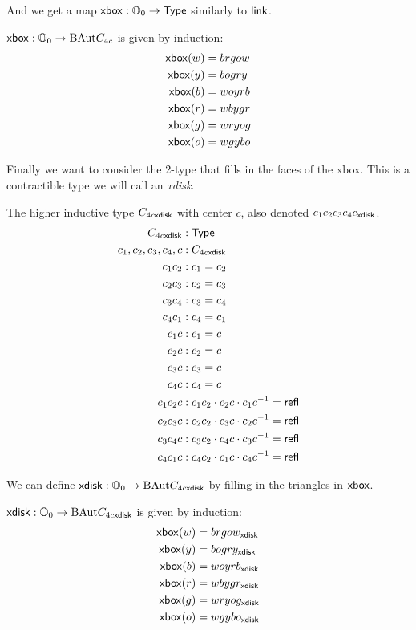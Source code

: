 And we get a map \( \mathsf{xbox}:\mathbb{O}_0\to\mathsf{Type} \) similarly to \( \mathsf{link} \).
\begin{mydef}
\( \mathsf{xbox}:\mathbb{O}_0\to\mathrm{BAut} C_{4c} \) is given by induction:
\begin{align*}
\mathsf{xbox}(w) &= brgow \\
\mathsf{xbox}(y) &= bogry \\
\mathsf{xbox}(b) &= woyrb \\
\mathsf{xbox}(r) &= wbygr \\
\mathsf{xbox}(g) &= wryog \\
\mathsf{xbox}(o) &= wgybo
\end{align*}
\end{mydef}

Finally we want to consider the 2-type that fills in the faces of the xbox. This is a contractible type we will call an \emph{xdisk}. 

\begin{mydef}
The higher inductive type \( C_{4c\mathsf{xdisk}} \) with center \( c \), also denoted \( c_1c_2c_3c_4c_{\mathsf{xdisk}} \).
\begin{align*}
C_{4c\mathsf{xdisk}} &: \mathsf{Type} \\
c_1, c_2, c_3, c_4, c &: C_{4c\mathsf{xdisk}} \\
c_1c_2 &: c_1 = c_2 \\
c_2c_3 &: c_2 = c_3 \\
c_3c_4 &: c_3 = c_4 \\
c_4c_1 &: c_4 = c_1 \\
c_1c &: c_1 = c \\
c_2c &: c_2 = c \\
c_3c &: c_3 = c \\
c_4c &: c_4 = c \\
c_1c_2c &: c_1c_2\cdot c_2c\cdot c_1c^{-1} = \mathsf{refl} \\
c_2c_3c &: c_2c_2\cdot c_3c\cdot c_2c^{-1} = \mathsf{refl} \\
c_3c_4c &: c_3c_2\cdot c_4c\cdot c_3c^{-1} = \mathsf{refl} \\
c_4c_1c &: c_4c_2\cdot c_1c\cdot c_4c^{-1} = \mathsf{refl}
\end{align*}
\end{mydef}

We can define \( \mathsf{xdisk}:\mathbb{O}_0\to\mathrm{BAut} C_{4c\mathsf{xdisk}} \) by filling in the triangles in \( \mathsf{xbox} \).

\begin{mydef}
\( \mathsf{xdisk}:\mathbb{O}_0\to\mathrm{BAut} C_{4c\mathsf{xdisk}} \) is given by induction:
\begin{align*}
\mathsf{xbox}(w) &= brgow_{\mathsf{xdisk}} \\
\mathsf{xbox}(y) &= bogry_{\mathsf{xdisk}} \\
\mathsf{xbox}(b) &= woyrb_{\mathsf{xdisk}} \\
\mathsf{xbox}(r) &= wbygr_{\mathsf{xdisk}} \\
\mathsf{xbox}(g) &= wryog_{\mathsf{xdisk}} \\
\mathsf{xbox}(o) &= wgybo_{\mathsf{xdisk}}
\end{align*}
\end{mydef}

